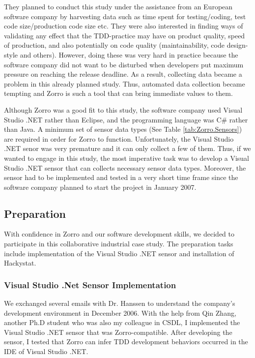 They planned to conduct this study under the assistance from an European software company by harvesting data such as time spent for testing/coding, test code size/production code size etc. They were also interested in finding ways of validating any effect that the TDD-practice may have on product quality, speed of production, and also potentially on code quality (maintainability, code design-style and others). However, doing these was very hard in practice because the software company did not want to be disturbed when developers put maximum pressure on reaching the release deadline. As a result, collecting data became a problem in this already planned study. Thus, automated data collection became tempting and Zorro is such a tool that can bring immediate values to them.

Although Zorro was a good fit to this study, the software company used Visual Studio .NET rather than Eclipse, and the programming language was C\# rather than Java. A minimum set of sensor data types (See Table \ref{tab:Zorro.Sensors}) are required in order for Zorro to function. Unfortunately, the Visual Studio .NET senor was very premature and it can only collect a few of them. Thus, if we wanted to engage in this study, the most imperative task was to develop a Visual Studio .NET sensor that can collects necessary sensor data types. Moreover, the sensor had to be implemented and tested in a very short time frame since the software company planned to start the project in January 2007.

\subsection{Preparation}
\label{sec:Industry-Journal-Preparation}
With confidence in Zorro and our software development skills, we decided to participate in this collaborative industrial case study. The preparation tasks include implementation of the Visual Studio .NET sensor and installation of Hackystat.

\subsubsection{Visual Studio .Net Sensor Implementation}
We exchanged several emails with Dr. Hanssen to understand the company's development environment in December 2006. %
With the help from Qin Zhang, another Ph.D student who was also my colleague in CSDL, I implemented the Visual Studio .NET sensor that was Zorro-compatible. After developing the sensor, I tested that Zorro can infer TDD development behaviors occurred in the IDE of Visual Studio .NET.  

